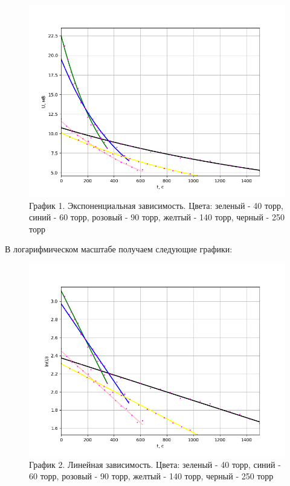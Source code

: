 \documentclass[a4paper,12pt]{article} %
\begin{document}
\begin{enumerate}
\begin{figure}[h!]
	\centering
	\includegraphics[scale=0.8]{Pictures/Все(эксп).png}
	\caption*{График 1. Экспоненциальная зависимость. Цвета: зеленый - 40 торр, синий - 60 торр, розовый - 90 торр, желтый - 140 торр, черный - 250 торр}
\end{figure}
\vspace{10mm}
\newpage
В логарифмическом масштабе получаем следующие графики:
\begin{figure}[h!]
	\centering
	\includegraphics[scale=0.8]{Pictures/Все(лин).png}
	\caption*{График 2. Линейная зависимость. Цвета: зеленый - 40 торр, синий - 60 торр, розовый - 90 торр, желтый - 140 торр, черный - 250 торр}
\end{figure}


\end{enumerate}
\end{document}
